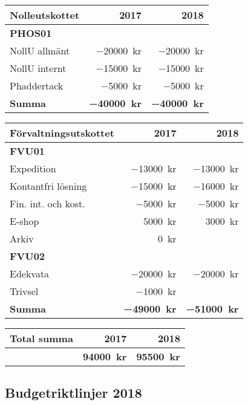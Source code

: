 \documentclass[10pt]{article}
\begin{document}
\begin{tabularx}{10cm}{X r r}
    \textbf{\large Nolleutskottet} & \textbf{2017} & \textbf{2018} \\
    \hline
    \textbf{PHOS01} \\
    NollU allmänt & \SI{-20000}{kr} & \SI{-20000}{kr} \\
    NollU internt & \SI{-15000}{kr} & \SI{-15000}{kr} \\
    Phaddertack & \SI{-5000}{kr} & \SI{-5000}{kr} \\
    \hline
    \textbf{Summa} & \textbf{\SI{-40000}{kr}} & \textbf{\SI{-40000}{kr}} \\
\end{tabularx}

\begin{tabularx}{9cm}{X r r}
    \textbf{\large Förvaltningsutskottet} & \textbf{2017} & \textbf{2018} \\
    \hline
    \textbf{FVU01} \\
    Expedition & \SI{-13000}{kr} & \SI{-13000}{kr} \\
    Kontantfri lösning & \SI{-15000}{kr} & \SI{-16000}{kr} \\
    Fin. int. och kost. & \SI{-5000}{kr} & \SI{-5000}{kr} \\
    E-shop & \SI{5000}{kr} & \SI{3000}{kr} \\
    Arkiv & \SI{0}{kr} & \\
    \textbf{FVU02} \\
    Edekvata & \SI{-20000}{kr} & \SI{-20000}{kr} \\
    Trivsel & \SI{-1000}{kr} & \\
    \hline
    \textbf{Summa} & \textbf{\SI{-49000}{kr}} & \textbf{\SI{-51000}{kr}} \\
\end{tabularx}

\begin{tabularx}{9cm}{X r r}
    \textbf{\large Total summa} & \textbf{2017} & \textbf{2018} \\
    \hline
     & \textbf{\SI{94000}{kr}} & \textbf{\SI{95500}{kr}} \\
\end{tabularx}


\newpage
\subsection*{Budgetriktlinjer 2018}
\end{document}
